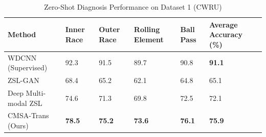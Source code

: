 \begin{table}[htbp]
\centering
\caption{Zero-Shot Diagnosis Performance on Dataset 1 (CWRU)}
\label{tab:cwru_results}
\begin{tabular}{p{3.5cm}p{2cm}p{2cm}p{2cm}p{2cm}p{2.5cm}}
\toprule
\textbf{Method} & \textbf{Inner Race} & \textbf{Outer Race} & \textbf{Rolling Element} & \textbf{Ball Pass} & \textbf{Average Accuracy (\%)} \\
\midrule
WDCNN (Supervised) & 92.3 & 91.5 & 89.7 & 90.8 & \textbf{91.1} \\
\midrule
ZSL-GAN & 68.4 & 65.2 & 62.1 & 64.8 & 65.1 \\
\midrule
Deep Multi-modal ZSL & 74.6 & 71.3 & 69.8 & 72.5 & 72.1 \\
\midrule
CMSA-Trans (Ours) & \textbf{78.5} & \textbf{75.2} & \textbf{73.6} & \textbf{76.1} & \textbf{75.9} \\
\bottomrule
\end{tabular}
\end{table}